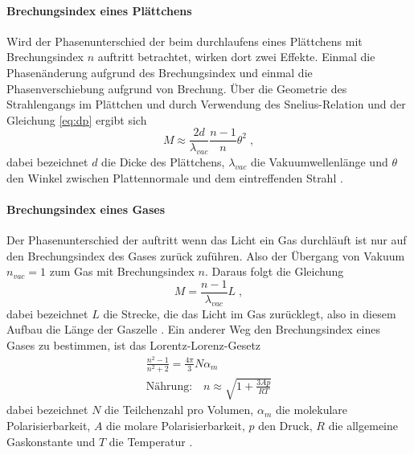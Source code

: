 \paragraph{Brechungsindex eines Plättchens}
Wird der Phasenunterschied der beim durchlaufens eines Plättchens mit Brechungsindex $n$ auftritt betrachtet, 
wirken dort zwei Effekte. Einmal die Phasenänderung aufgrund des Brechungsindex und einmal die 
Phasenverschiebung aufgrund von Brechung. Über die Geometrie des Strahlengangs im Plättchen und durch 
Verwendung des Snelius-Relation und der Gleichung \eqref{eq:dp} ergibt sich
\begin{equation}
M \approx \frac{2d}{\lambda_{vac}} \frac{n-1}{n} \theta^2 \; ,
\label{eq:pM}
\end{equation}
dabei bezeichnet $d$ die Dicke des Plättchens, $\lambda_{vac}$ die Vakuumwellenlänge und $\theta$ den 
Winkel zwischen Plattennormale und dem eintreffenden Strahl \cite{Anleitung}. 
\paragraph{Brechungsindex eines Gases}
Der Phasenunterschied der auftritt wenn das Licht ein Gas durchläuft ist nur auf den Brechungsindex des 
Gases zurück zuführen. Also der Übergang von Vakuum $n_{vac}= 1$ zum Gas mit Brechungsindex $n$. Daraus folgt 
die Gleichung 
\begin{equation}
M = \frac{n-1}{\lambda_{vac}} L \; ,
\label{eq:lM}
\end{equation}
dabei bezeichnet $L$ die Strecke, die das Licht im Gas zurücklegt, also in diesem Aufbau die Länge der Gaszelle 
\cite{Anleitung}. Ein anderer Weg den Brechungsindex eines Gases zu bestimmen, ist das Lorentz-Lorenz-Gesetz 
\begin{gather}
\frac{n^2 -1}{n^2 +2} = \frac{4\pi}{3} N \alpha_m \\
\text{Nährung:} \quad n \approx \sqrt{1+ \frac{3Ap}{RT}}
\label{eq:NLL}
\end{gather}
dabei bezeichnet $N$ die Teilchenzahl pro Volumen, $\alpha_m$ die molekulare Polarisierbarkeit, $A$ die 
molare Polarisierbarkeit, $p$ den Druck, $R$ die allgemeine Gaskonstante und $T$ die Temperatur 
\cite{LLG}. 

